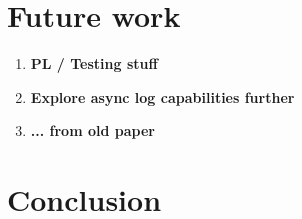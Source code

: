 \documentclass[letterpaper,twocolumn,english]{article}
\begin{document}
%
%
%
%    
% 
%
%
%
%
%
%    
%
%

\section{Future work}
\begin{enumerate}
  \item {\bf PL / Testing stuff}
  \item {\bf Explore async log capabilities further}
  \item {\bf ... from old paper}
\end{enumerate}
\section{Conclusion}
\end{document}
